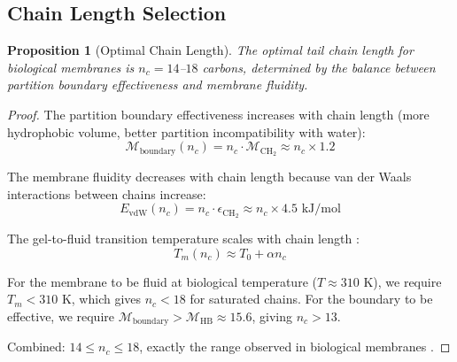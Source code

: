 \documentclass[twocolumn,10pt]{article}
\newtheorem{proposition}[theorem]{Proposition}
\theoremstyle{remark}
\newcommand{\Depth}{\mathcal{M}}
\begin{document}
\subsection{Chain Length Selection}

\begin{proposition}[Optimal Chain Length]
\label{prop:chain_length}
The optimal tail chain length for biological membranes is $n_c = 14$--$18$ carbons, determined by the balance between partition boundary effectiveness and membrane fluidity.
\end{proposition}

\begin{proof}
The partition boundary effectiveness increases with chain length (more hydrophobic volume, better partition incompatibility with water):
\begin{equation}
    \Depth_{\text{boundary}}(n_c) = n_c \cdot \Depth_{\text{CH}_2} \approx n_c \times 1.2
\end{equation}

The membrane fluidity decreases with chain length because van der Waals interactions between chains increase:
\begin{equation}
    E_{\text{vdW}}(n_c) = n_c \cdot \epsilon_{\text{CH}_2} \approx n_c \times 4.5 \text{ kJ/mol}
\end{equation}

The gel-to-fluid transition temperature scales with chain length \cite{marsh2013}:
\begin{equation}
    T_m(n_c) \approx T_0 + \alpha n_c
\end{equation}

For the membrane to be fluid at biological temperature ($T \approx 310$ K), we require $T_m < 310$ K, which gives $n_c < 18$ for saturated chains. For the boundary to be effective, we require $\Depth_{\text{boundary}} > \Depth_{\text{HB}} \approx 15.6$, giving $n_c > 13$.

Combined: $14 \leq n_c \leq 18$, exactly the range observed in biological membranes \cite{vance2008,vanmeer2008}.
\end{proof}
\end{document}
